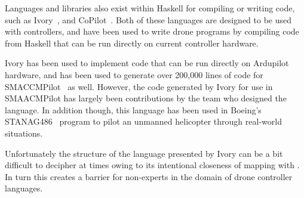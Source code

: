 \documentclass{sig-alternate-05-2015}
\begin{document}
Languages and libraries also exist within Haskell for compiling or writing
 code, such as Ivory~\cite{Eea15ivory}, and
CoPilot~\cite{PGMN10copilot}. Both of these languages are designed to be
used with controllers, and have been used to write drone programs by compiling
 code from Haskell that can be run directly on current controller
hardware.

Ivory has been used to implement code that can be run directly on Ardupilot
hardware, and has been used to generate over 200,000 lines of code for
SMACCMPilot~\cite{Hea14build} as well. However, the code generated by
Ivory for use in SMAACMPilot has largely been contributions by the team who
designed the language. In addition though, this language has been used in
Boeing's STANAG486~\cite{B16little} program to pilot an unmanned
helicopter through real-world situations.

Unfortunately the structure of the language presented by Ivory can be a bit
difficult to decipher at times owing to its intentional closeness of mapping
with . In turn this creates a barrier for non-experts in the domain of
drone controller languages.



\end{document}
